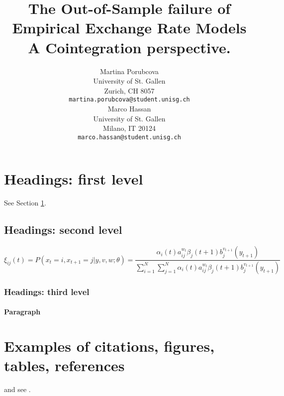 \documentclass{article}
\title{The Out-of-Sample failure of Empirical Exchange Rate Models \textendash  A Cointegration perspective.}
\author{
  Martina Porubcova 	        \\
  University of St. Gallen	\\
  Zurich, CH 8057 		\\
  \texttt{martina.porubcova@student.unisg.ch} \\
   \And
  Marco Hassan 	           	\\
  University of St. Gallen	\\
  Milano, IT 20124		\\
  \texttt{marco.hassan@student.unisg.ch} \\
}
\begin{document}
\maketitle





  





%

%

%

\section{Headings: first level}
\label{sec:headings} %

\lipsum[4] See Section \ref{sec:headings}.

\subsection{Headings: second level}
\lipsum[5]
\begin{equation}
\xi _{ij}(t)=P(x_{t}=i,x_{t+1}=j|y,v,w;\theta)= {\frac {\alpha _{i}(t)a^{w_t}_{ij}\beta _{j}(t+1)b^{v_{t+1}}_{j}(y_{t+1})}{\sum _{i=1}^{N} \sum _{j=1}^{N} \alpha _{i}(t)a^{w_t}_{ij}\beta _{j}(t+1)b^{v_{t+1}}_{j}(y_{t+1})}}
\end{equation}

\subsubsection{Headings: third level}
\lipsum[6]

\paragraph{Paragraph}
\lipsum[7]

\section{Examples of citations, figures, tables, references}
\label{sec:others}
\cite{kour2014real,kour2014fast} and see \cite{hadash2018estimate}.
\end{document}
